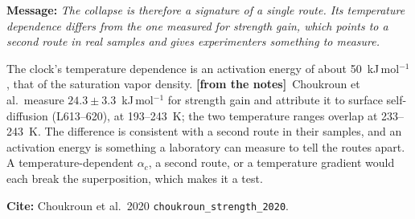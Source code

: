 \documentclass[11pt]{article}
\newcommand{\Note}{\textcolor{open}{\textbf{[from the notes]}}\ }
\newcommand{\Cite}[1]{\par{\footnotesize\raggedright\textcolor{have}{\textbf{Cite:}} #1\par}}
\newcommand{\Msg}[1]{\par\textcolor{open}{\textbf{Message:}} \textit{#1}\par}
\begin{document}
\begin{enumerate}
  \Msg{The collapse is therefore a signature of a single route. Its temperature dependence differs from the one measured for strength gain, which points to a second route in real samples and gives experimenters something to measure.}
  The
  clock's temperature dependence is an activation energy of about
  50~kJ\,mol$^{-1}$, that of the saturation vapor density. \Note Choukroun
  et al.\ measure $24.3 \pm 3.3$~kJ\,mol$^{-1}$ for strength gain and
  attribute it to surface self-diffusion (L613--620), at 193--243~K; the two
  temperature ranges overlap at 233--243~K. The difference is consistent
  with a second route in their samples, and an activation energy is
  something a laboratory can measure to tell the routes apart. A temperature-dependent
  $\alpha_c$, a second route, or a temperature gradient would each break the
  superposition, which makes it a test.
  \Cite{Choukroun et al.\ 2020 \texttt{choukroun\_strength\_2020}.}
\end{enumerate}
\end{document}
